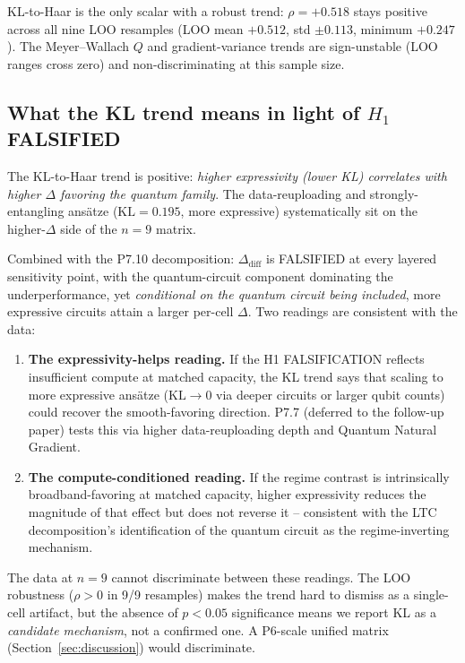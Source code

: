 KL-to-Haar is the only scalar with a robust trend: $\rho = +0.518$
stays positive across all nine LOO resamples (LOO mean $+0.512$, std
$\pm 0.113$, minimum $+0.247$). The Meyer--Wallach $Q$ and
gradient-variance trends are sign-unstable (LOO ranges cross zero) and
non-discriminating at this sample size.

\subsection{What the KL trend means in light of $H_1$ FALSIFIED}
\label{sec:mechanism-interp}

The KL-to-Haar trend is positive: \emph{higher expressivity (lower KL)
correlates with higher $\Delta$ favoring the quantum family}. The
data-reuploading and strongly-entangling ansätze ($\mathrm{KL} =
0.195$, more expressive) systematically sit on the higher-$\Delta$ side
of the $n=9$ matrix.

Combined with the P7.10 decomposition: $\Delta_\text{diff}$ is
FALSIFIED at every layered sensitivity point, with the quantum-circuit
component dominating the underperformance, yet \emph{conditional on the
quantum circuit being included}, more expressive circuits attain a
larger per-cell $\Delta$. Two readings are consistent with the data:

\begin{enumerate}
  \item \textbf{The expressivity-helps reading.} If the H1
        FALSIFICATION reflects insufficient compute at matched
        capacity, the KL trend says that scaling to more expressive
        ansätze ($\mathrm{KL} \to 0$ via deeper circuits or larger
        qubit counts) could recover the smooth-favoring direction.
        P7.7 (deferred to the follow-up paper) tests this via higher
        data-reuploading depth and Quantum Natural Gradient.
  \item \textbf{The compute-conditioned reading.} If the regime
        contrast is intrinsically broadband-favoring at matched
        capacity, higher expressivity reduces the magnitude of that
        effect but does not reverse it -- consistent with the LTC
        decomposition's identification of the quantum circuit as the
        regime-inverting mechanism.
\end{enumerate}

The data at $n=9$ cannot discriminate between these readings. The LOO
robustness ($\rho > 0$ in 9/9 resamples) makes the trend hard to
dismiss as a single-cell artifact, but the absence of $p < 0.05$
significance means we report KL as a \emph{candidate mechanism}, not a
confirmed one. A P6-scale unified matrix
(Section~\ref{sec:discussion}) would discriminate.

